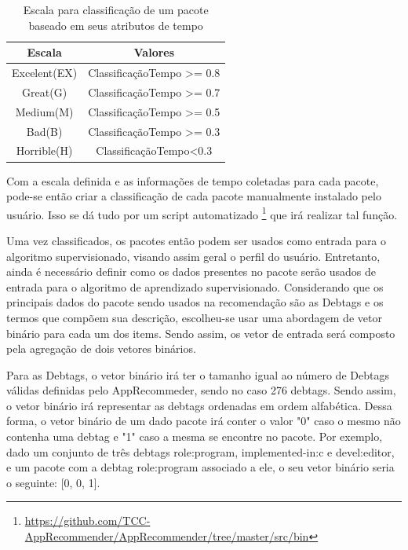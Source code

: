 \begin{table}[h]
\centering
\begin{tabular}{cc}
\hline
\rowcolor[HTML]{EFEFEF}
{Escala} & {Valores} \\ \hline
{Excelent(EX)}  & ClassificaçãoTempo >= 0.8                  \\ \hline
{Great(G)}   & ClassificaçãoTempo >= 0.7                  \\ \hline
{Medium(M)}   & ClassificaçãoTempo >= 0.5                  \\ \hline
{Bad(B)}   & ClassificaçãoTempo >= 0.3                  \\ \hline
{Horrible(H)}   &ClassificaçãoTempo<0.3                   \\ \hline
\end{tabular}
\caption{Escala para classificação de um pacote baseado em seus atributos de tempo}
\label{tab:classificacao_pacotes}
\end{table}


Com a escala definida e as informações de tempo coletadas para cada pacote,
pode-se então criar a classificação de cada pacote manualmente instalado pelo
usuário.
Isso se dá tudo por um script automatizado \footnote{\url{https://github.com/TCC-AppRecommender/AppRecommender/tree/master/src/bin}}
que irá realizar tal função.

Uma vez classificados, os pacotes então podem ser usados como entrada para o
algoritmo supervisionado, visando assim geral o perfil do usuário.
Entretanto, ainda é necessário definir como os dados presentes no pacote serão usados de entrada para o
algoritmo de aprendizado supervisionado. Considerando que os principais dados do pacote sendo usados na
recomendação são as Debtags e os termos que compõem sua descrição, escolheu-se usar uma abordagem de
vetor binário para cada um dos items. Sendo assim, os vetor de entrada será composto pela agregação de dois vetores
binários.

Para as Debtags, o vetor binário irá ter o tamanho igual ao número de Debtags
válidas definidas pelo AppRecommeder, sendo no caso 276 debtags. Sendo assim, o
vetor binário irá representar as debtags ordenadas em ordem alfabética. Dessa forma,
o vetor binário de um dado pacote irá conter o valor "0" caso o mesmo não contenha uma debtag e "1" caso a mesma se encontre
no pacote. Por exemplo, dado um conjunto de três debtags role:program, implemented-in:c e devel:editor, e um pacote com a debtag
role:program associado a ele, o seu vetor binário seria o seguinte: [0, 0, 1].

